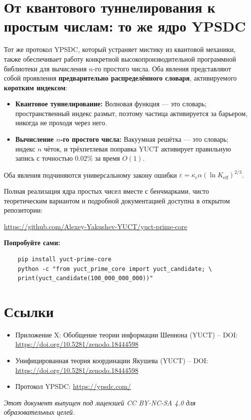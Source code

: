 \documentclass[12pt,a4paper]{article}
\begin{document}
\section{От квантового туннелирования к простым числам: то же ядро YPSDC}

Тот же протокол YPSDC, который устраняет мистику из квантовой
механики, также обеспечивает работу конкретной высокопроизводительной
программной библиотеки для вычисления $n$-го простого числа. Оба
явления представляют собой проявления \textbf{предварительно
	распределённого словаря}, активируемого \textbf{коротким индексом}:

\begin{itemize}
	\item \textbf{Квантовое туннелирование:} Волновая функция — это
	словарь; пространственный индекс размыт, поэтому частица
	активируется за барьером, никогда не проходя через него.
	\item \textbf{Вычисление $n$-го простого числа:} Вакуумная решётка — это
	словарь; индекс $n$ чёток, и трёхпетлевая поправка YUCT
	активирует правильную запись с точностью $0.02\%$ за время $O(1)$.
\end{itemize}

Оба явления подчиняются универсальному закону ошибки
$\varepsilon = \kappa_c\alpha(\ln K_{\mathrm{eff}})^{2/3}$.

Полная реализация ядра простых чисел вместе с бенчмарками,
чисто теоретическим вариантом и подробной документацией доступна
в открытом репозитории:

\begin{center}
	\url{https://github.com/Alexey-Yakushev-YUCT/yuct-prime-core}
\end{center}

\textbf{Попробуйте сами:}
\begin{verbatim}
	pip install yuct-prime-core
	python -c "from yuct_prime_core import yuct_candidate; \
	print(yuct_candidate(100_000_000_000))"
\end{verbatim}

	\section{Ссылки}
	
	\begin{itemize}
		\item Приложение X: Обобщение теории информации Шеннона (YUCT) – DOI: \url{https://doi.org/10.5281/zenodo.18444598}
		\item Унифицированная теория координации Якушева (YUCT) – DOI: \url{https://doi.org/10.5281/zenodo.18444598}
		\item Протокол YPSDC: \url{https://ypsdc.com/}
	\end{itemize}
	
	\noindent\textit{Этот документ выпущен под лицензией CC BY-NC-SA 4.0 для образовательных целей.}
	
\end{document}
